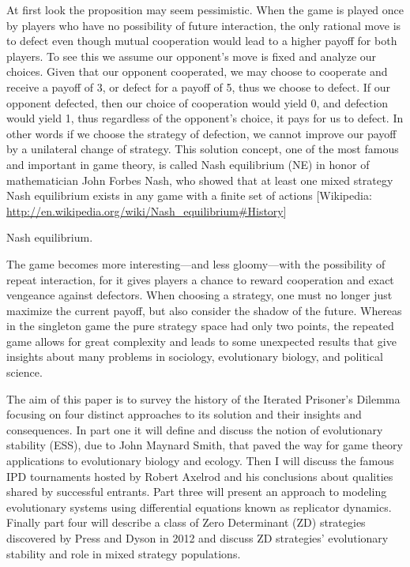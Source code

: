 At first look the proposition may seem pessimistic. When the game is played once by players who have no possibility of future interaction, the only rational move is to defect even though mutual cooperation would lead to a higher payoff for both players. To see this we assume our opponent's move is fixed and analyze our choices. Given that our opponent cooperated, we may choose to cooperate and receive a payoff of 3, or defect for a payoff of 5, thus we choose to defect. If our opponent defected, then our choice of cooperation would yield 0, and defection would yield 1, thus regardless of the opponent's choice, it pays for us to defect. In other words if we choose the strategy of defection, we cannot improve our payoff by a unilateral change of strategy. This solution concept, one of the most famous and important in game theory, is called Nash equilibrium (NE) in honor of mathematician John Forbes Nash, who showed that at least one mixed strategy Nash equilibrium exists in any game with a finite set of actions [Wikipedia: \url{http://en.wikipedia.org/wiki/Nash_equilibrium#History}]
\begin{definition} Nash equilibrium.
\end{definition}

The game becomes more interesting---and less gloomy---with the possibility of repeat interaction, for it gives players a chance to reward cooperation and exact vengeance against defectors. When choosing a strategy, one must no longer just maximize the current payoff, but also consider the shadow of the future. Whereas in the singleton game the pure strategy space had only two points, the repeated game allows for great complexity and leads to some unexpected results that give insights about many problems in sociology, evolutionary biology, and political science.

The aim of this paper is to survey the history of the Iterated Prisoner's Dilemma focusing on four distinct approaches to its solution and their insights and consequences. In part one it will define and discuss the notion of evolutionary stability (ESS), due to John Maynard Smith, that paved the way for game theory applications to evolutionary biology and ecology. Then I will discuss the famous IPD tournaments hosted by Robert Axelrod and his conclusions about qualities shared by successful entrants. Part three will present an approach to modeling evolutionary systems using differential equations known as replicator dynamics. Finally part four will describe a class of Zero Determinant (ZD) strategies discovered by Press and Dyson in 2012 and discuss ZD strategies' evolutionary stability and role in mixed strategy populations.


